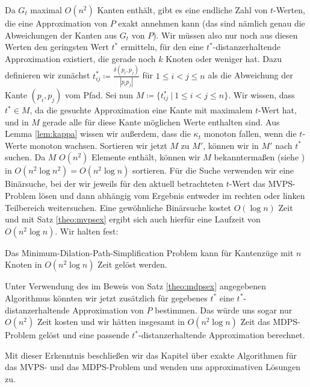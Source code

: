 	Da $G_t$ maximal $O(n^2)$ Kanten enthält, gibt es eine endliche Zahl von $t$-Werten, die eine Approximation von $P$ exakt annehmen kann (das sind nämlich genau die Abweichungen der Kanten aus $G_t$ von $P$). 
	Wir müssen also nur noch aus diesen Werten den geringsten Wert $t^*$ ermitteln, für den eine $t^*$-distanzerhaltende Approximation existiert, die gerade noch $k$ Knoten oder weniger hat. 
	Dazu definieren wir zunächst $t^*_{ij} \coloneqq\frac{\delta(p_i, p_j)}{|p_i p_j|}$ für $1\leq i < j \leq n$ als die Abweichung der Kante $(p_i, p_j)$ vom Pfad. Sei nun $M\coloneqq\{t^*_{ij}\ |\ 1\leq i < j \leq n\}$. 
	Wir wissen, dass $t^* \in M$, da die gesuchte Approximation eine Kante mit maximalem $t$-Wert hat, und in $M$ gerade alle für diese Kante möglichen Werte enthalten sind. 
	Aus Lemma \ref{lem:kappa} wissen wir außerdem, dass die $\kappa_t$ monoton fallen, wenn die $t$-Werte monoton wachsen. 
	Sortieren wir jetzt $M$ zu $M'$, können wir in $M'$ nach $t^*$ suchen. Da $M$ $O(n^2)$ Elemente enthält, können wir $M$ bekanntermaßen (siehe \cite{hagerup}) in $O(n^2\log n^2)=O(n^2\log n)$ sortieren. 
	Für die Suche verwenden wir eine Binärsuche, bei der wir jeweils für den aktuell betrachteten $t$-Wert das MVPS-Problem lösen und dann abhängig vom Ergebnis entweder im rechten oder linken Teilbereich weitersuchen. 
	Eine gewöhnliche Binärsuche kostet $O(\log n)$ Zeit und mit Satz \ref{theo:mvpsex} ergibt sich auch hierfür eine Laufzeit von $O(n^2\log n)$. Wir halten fest:
	\begin{theorem}
		\label{theo:mdpsex}
		Das Minimum-Dilation-Path-Simplification Problem kann für Kantenzüge mit $n$ Knoten in $O(n^2 \log n)$ Zeit gelöst werden.
	\end{theorem}
	
	Unter Verwendung des im Beweis von Satz \ref{theo:mdpsex} angegebenen Algorithmus könnten wir jetzt zusätzlich für gegebenes $t^*$ eine $t^*$-distanzerhaltende Approximation von $P$ bestimmen. 
	Das würde uns sogar nur $O(n^2)$ Zeit kosten und wir hätten insgesamt in $O(n^2 \log n)$ Zeit das MDPS-Problem gelöst und eine passende $t^*$-distanzerhaltende Approximation berechnet.
	
	Mit dieser Erkenntnis beschließen wir das Kapitel über exakte Algorithmen für das MVPS- und das MDPS-Problem und wenden uns approximativen Lösungen zu.

